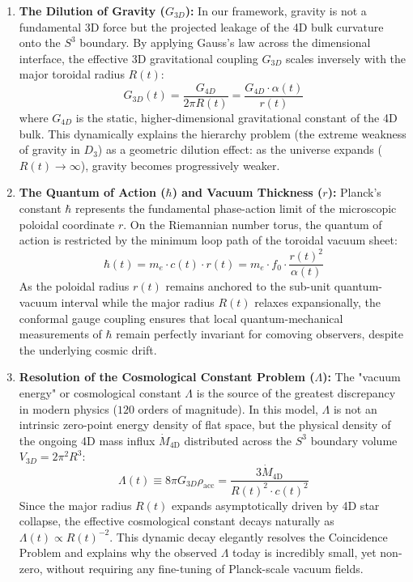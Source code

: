 \documentclass[11pt,a4paper]{article}
\theoremstyle{plain}
\theoremstyle{definition}
\theoremstyle{remark}
\begin{document}
\begin{enumerate}
    \item \textbf{The Dilution of Gravity ($G_{3D}$):} 
    In our framework, gravity is not a fundamental 3D force but the projected leakage of the 4D bulk curvature onto the $S^3$ boundary. By applying Gauss's law across the dimensional interface, the effective 3D gravitational coupling $G_{3D}$ scales inversely with the major toroidal radius $R(t)$:
    \begin{equation}
    G_{3D}(t) = \frac{G_{4D}}{2\pi R(t)} = \frac{G_{4D} \cdot \alpha(t)}{r(t)}
    \end{equation}
    where $G_{4D}$ is the static, higher-dimensional gravitational constant of the 4D bulk. This dynamically explains the hierarchy problem (the extreme weakness of gravity in $D_3$) as a geometric dilution effect: as the universe expands ($R(t) \to \infty$), gravity becomes progressively weaker.

    \item \textbf{The Quantum of Action ($\hbar$) and Vacuum Thickness ($r$):}
    Planck's constant $\hbar$ represents the fundamental phase-action limit of the microscopic poloidal coordinate $r$. On the Riemannian number torus, the quantum of action is restricted by the minimum loop path of the toroidal vacuum sheet:
    \begin{equation}
    \hbar(t) = m_e \cdot c(t) \cdot r(t) = m_e \cdot f_0 \cdot \frac{r(t)^2}{\alpha(t)}
    \end{equation}
    As the poloidal radius $r(t)$ remains anchored to the sub-unit quantum-vacuum interval while the major radius $R(t)$ relaxes expansionally, the conformal gauge coupling ensures that local quantum-mechanical measurements of $\hbar$ remain perfectly invariant for comoving observers, despite the underlying cosmic drift.

    \item \textbf{Resolution of the Cosmological Constant Problem ($\Lambda$):}
    The "vacuum energy" or cosmological constant $\Lambda$ is the source of the greatest discrepancy in modern physics ($120$ orders of magnitude). In this model, $\Lambda$ is not an intrinsic zero-point energy density of flat space, but the physical density of the ongoing 4D mass influx $\dot{M}_{\text{4D}}$ distributed across the $S^3$ boundary volume $V_{3D} = 2\pi^2 R^3$:
    \begin{equation}
    \Lambda(t) \equiv 8\pi G_{3D} \rho_{\text{acc}} = \frac{3 \dot{M}_{\text{4D}}}{R(t)^2 \cdot c(t)^2}
    \end{equation}
    Since the major radius $R(t)$ expands asymptotically driven by 4D star collapse, the effective cosmological constant decays naturally as $\Lambda(t) \propto R(t)^{-2}$. This dynamic decay elegantly resolves the Coincidence Problem and explains why the observed $\Lambda$ today is incredibly small, yet non-zero, without requiring any fine-tuning of Planck-scale vacuum fields.
\end{enumerate}
\end{document}
